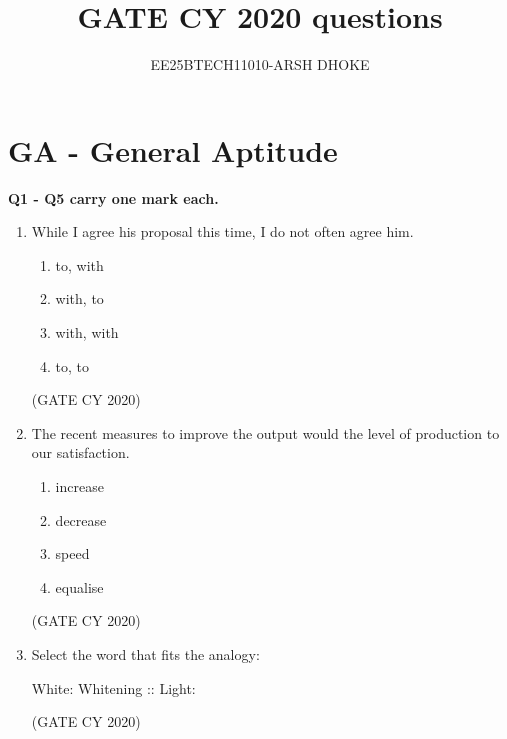 \documentclass[12pt]{article}
\author{EE25BTECH11010-ARSH DHOKE}
\title{GATE CY 2020 questions}
\date{}
\begin{document}
\maketitle

\section*{GA - General Aptitude}
\textbf{Q1 - Q5 carry one mark each.}

\begin{enumerate}
\item While I agree \underline{\hspace{2cm}} his proposal this time, I do not often agree \underline{\hspace{2cm}} him.
\begin{multicols}{2}
\begin{enumerate}
\item to, with
\item with, to
\item with, with
\item to, to
\end{enumerate}
\end{multicols}
\hfill (GATE CY 2020)

\item The recent measures to improve the output would \underline{\hspace{2cm}} the level of production to our satisfaction.
\begin{multicols}{2}
\begin{enumerate}
\item increase
\item decrease
\item speed
\item equalise
\end{enumerate}
\end{multicols}
\hfill (GATE CY 2020)

\item Select the word that fits the analogy:

White: Whitening :: Light: \underline{\hspace{2cm}}
\begin{enumerate}
\end{enumerate}
\hfill (GATE CY 2020)



\end{enumerate}
\end{document}
